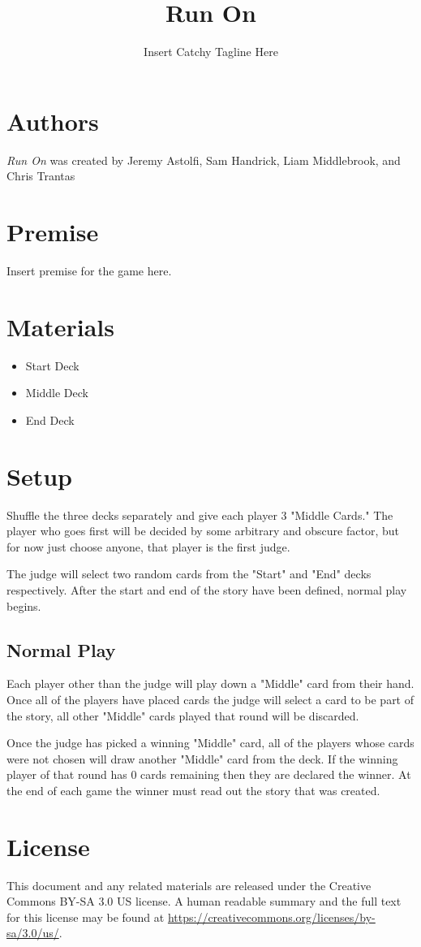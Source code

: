 \documentclass[twocolumn]{article}
\title{Run On}
\author{Insert Catchy Tagline Here}
\date{}
\begin{document}
\maketitle

\section*{Authors}

\emph{Run On} was created by Jeremy Astolfi, Sam Handrick, Liam Middlebrook, and Chris Trantas

\section*{Premise}

Insert premise for the game here.

\section*{Materials}

\begin{itemize}
	\item Start Deck
	\item Middle Deck
	\item End Deck
\end{itemize}

\section*{Setup}

Shuffle the three decks separately and give each player 3 "Middle Cards." The player who goes first will be decided by some arbitrary and obscure factor, but for now just choose anyone, that player is the first judge.

The judge will select two random cards from the "Start" and "End" decks respectively. After the start and end of the story have been defined, normal play begins.

\subsection*{Normal Play}

Each player other than the judge will play down a "Middle" card from their hand. Once all of the players have placed cards the judge will select a card to be part of the story, all other "Middle" cards played that round will be discarded.

Once the judge has picked a winning "Middle" card, all of the players whose cards were not chosen will draw another "Middle" card from the deck. If the winning player of that round has 0 cards remaining then they are declared the winner. At the end of each game the winner must read out the story that was created.

\section*{License}

This document and any related materials are released under the Creative Commons BY-SA 3.0 US license. A human readable summary and the full text for this license may be found at \url{https://creativecommons.org/licenses/by-sa/3.0/us/}.
\end{document}
